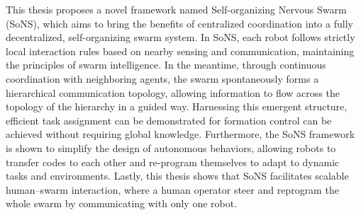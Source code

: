 This thesis proposes a novel framework named Self-organizing Nervous Swarm (SoNS), which aims to bring the benefits of centralized coordination into a fully decentralized, self-organizing swarm system.
In SoNS, each robot follows strictly local interaction rules based on nearby sensing and communication, maintaining the principles of swarm intelligence.
In the meantime, through continuous coordination with neighboring agents, the swarm spontaneously forms a hierarchical communication topology, allowing information to flow across the topology of the hierarchy in a guided way.
Harnessing this emergent structure, efficient task assignment can be demonstrated for formation control can be achieved without requiring global knowledge.
Furthermore, the SoNS framework is shown to simplify the design of autonomous behaviors, allowing robots to transfer codes to each other and re-program themselves to adapt to dynamic tasks and environments.
Lastly, this thesis shows that SoNS facilitates scalable human–swarm interaction, where a human operator steer and reprogram the whole swarm by communicating with only one robot.


